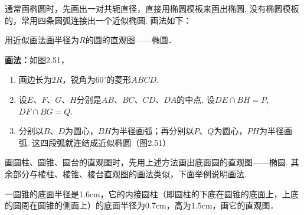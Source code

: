 通常画椭圆时，先画出一对共轭直径，直接用椭圆模板来画出椭圆. 没有椭圆模板的，常用四条圆弧连接出一个近似椭圆. 画法如下：

\begin{example}
    用近似画法画半径为$R$的圆的直观图——椭圆．
\end{example}

\begin{solution}
\textbf{画法：}如图2.51，
\begin{enumerate}[(1)]
\item 画边长为$2R$，锐角为$60^{\circ}$的菱形$ABCD$.
\item 设$E$、$F$、$G$、$H$分别是$AB$、$BC$、$CD$、$DA$的中点. 设$DE\cap BH=P$, $DF\cap BG=Q$.
\item 分别以$B$、$D$为圆心，$BH$为半径画弧；再分别以$P$、$Q$为圆心，$PH$为半径画弧. 这四段弧就连结成近似椭圆（图2.51）
\end{enumerate}
\end{solution}

\begin{figure}[htp]
    \centering
{}
    \caption{}
\end{figure}


画圆柱、圆锥、圆台的直观图时，先用上述方法画出底面圆的直观图——椭圆. 其余部分与棱柱、棱锥、棱台直观图的画法类似，下面举例说明画法.

\begin{example}
    一圆锥的底面半径是1.6cm，它的内接圆柱（即圆柱的下底在圆锥的底面上，上底的圆周在圆锥的侧面上）的底面半径为0.7cm，高为1.5cm，画它的直观图．
\end{example}

